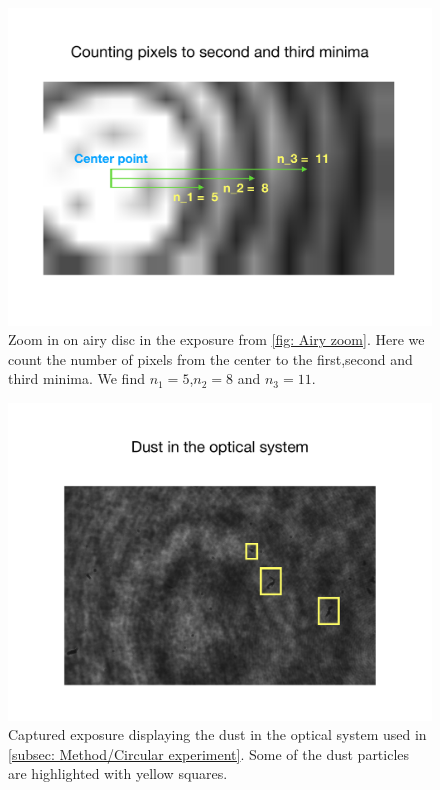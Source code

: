 \documentclass{emulateapj}
\begin{document}
\begin{figure}
\centering
\includegraphics[width=\linewidth]{airypixelcount.pdf}
\caption[Airy pixel count]{Zoom in on airy disc in the exposure from \cref{fig: Airy zoom}. Here we count the number of pixels from the center to the first,second and third minima. We find $n_1 = 5$,$n_2 = 8$ and $n_3 = 11$.}
\label{fig: Airy pixel}
\end{figure}

\begin{figure}
\centering
\includegraphics[width=\linewidth]{dust.pdf}
\caption[Optical disturbance from dust]{Captured exposure displaying the dust in the optical system used in \cref{subsec: Method/Circular experiment}. Some of the dust particles are highlighted with yellow squares.}
\label{fig: Airy dust}
\end{figure}
\end{document}
